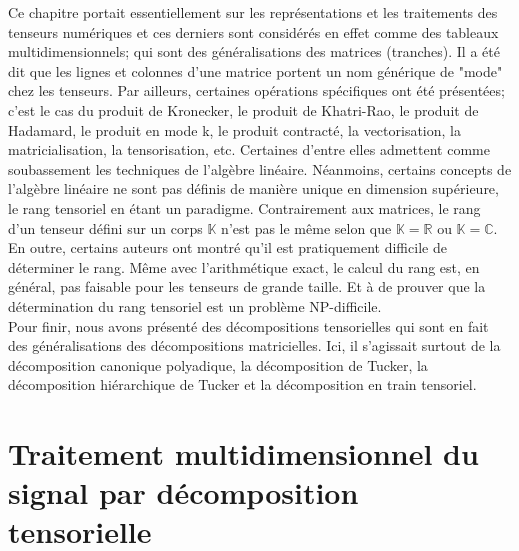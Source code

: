 \documentclass[11pt,a4paper,oneside]{book}
\def\R{\mathbb R}
\def\C{\mathbb C}
\def\K{\mathbb K}
\begin{document}
 Ce chapitre portait essentiellement sur les représentations et les traitements des tenseurs numériques et ces derniers sont considérés  en effet comme des tableaux multidimensionnels; qui sont des généralisations des matrices (tranches). Il a été dit que les lignes et colonnes d'une matrice portent un nom générique de "mode" chez les tenseurs. Par ailleurs, certaines opérations  spécifiques ont été présentées; c'est le cas du produit de Kronecker, le produit de Khatri-Rao, le produit de Hadamard, le produit en mode k, le produit contracté, la vectorisation, la matricialisation, la tensorisation, etc. Certaines d'entre elles admettent comme soubassement les techniques de l'algèbre linéaire. Néanmoins, certains concepts de l'algèbre linéaire ne sont pas définis de manière unique en dimension supérieure, le rang tensoriel en étant un paradigme. Contrairement aux matrices, le rang d'un tenseur défini sur un corps $ \K $ n'est pas le même selon que $ \K=\R $ ou $ \K=\C $. En outre, certains auteurs ont montré qu'il est pratiquement difficile de déterminer le rang. Même avec l'arithmétique exact, le calcul du rang est, en général, pas faisable pour les tenseurs de grande taille. Et à \cite{haastad1990tensor} de prouver que la détermination du rang tensoriel est un problème NP-difficile.\\ Pour finir, nous avons présenté des décompositions tensorielles qui sont en fait des généralisations des décompositions matricielles. Ici, il s'agissait surtout de la décomposition canonique polyadique, la décomposition de Tucker, la décomposition hiérarchique de Tucker et la décomposition en train tensoriel.

\chapter{Traitement multidimensionnel du signal par décomposition tensorielle}
\label{chap3}
\end{document}
